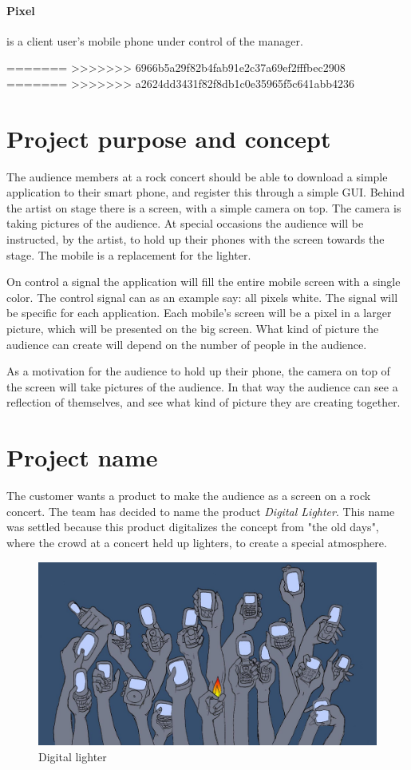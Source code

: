 \paragraph{Pixel} is a client user's mobile phone under control of the manager.

=======
>>>>>>> 6966b5a29f82b4fab91e2c37a69ef2fffbec2908
=======
>>>>>>> a2624dd3431f82f8db1c0e35965f5c641abb4236
\section{Project purpose and concept}
The audience members at a rock concert should be able to download a simple application to their smart phone, and register this through a simple GUI.
Behind the artist on stage there is a screen, with a simple camera on top. 
The camera is taking pictures of the audience. 
At special occasions the audience will be instructed, by the artist, to hold up their phones with the screen towards the stage. 
The mobile is a replacement for the lighter.  

On control a signal the application will fill the entire mobile screen with a single color.
The control signal can as an example say: all pixels white.
The signal will be specific for each application.
Each mobile's screen will be a pixel in a larger picture, which will be presented on the big screen. 
What kind of picture the audience can create will depend on the number of people in the audience. 

As a motivation for the audience to hold up their phone, the camera on top of the screen will take pictures of the audience.
In that way the audience can see a reflection of themselves, and see what kind of picture they are creating together.
\newpage
\section{Project name}
The customer wants a product to make the audience as a screen on a rock concert. 
The team has decided to name the product \emph{Digital Lighter}. 
This name was settled because this product digitalizes the concept from "the old days", where the crowd at a concert held up lighters, to create a special atmosphere. 

\begin{figure}[hbt]
\centering
\includegraphics[width=\textwidth]{introduction/phones.jpg}
\caption{Digital lighter}
\label{fig:digital lighter}
\end{figure}


